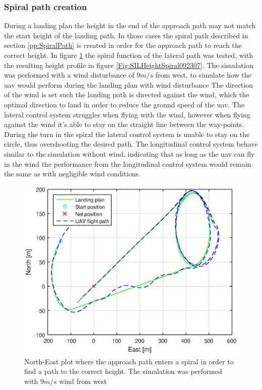 \subsubsection{Spiral path creation}
During a landing plan the height in the end of the approach path may not match the start height of the landing path. In those cases the spiral path described in section \ref{pp:SpiralPath} is created in order for the approach path to reach the correct height. In figure \ref{Fig:SILNorthEastSpiral092307} the spiral function of the lateral path was tested, with the resulting height profile in figure \ref{Fig:SILHeightSpiral092307}. The simulation was performed with a wind disturbance of $9 m/s$ from west, to simulate how the \gls{uav} would perform during the landing plan with wind disturbance The direction of the wind is set such the landing path is directed against the wind, which the optimal direction to land in order to reduce the ground speed of the \gls{uav}. The lateral control system struggles when flying with the wind, however when flying against the wind it's able to stay on the straight line between the way-points. During the turn in the spiral the lateral control system is unable to stay on the circle, thus overshooting the desired path. The longitudinal control system behave similar to the simulation without wind, indicating that as long as the \gls{uav} can fly in the wind the performance from the longitudinal control system would remain the same as with negligible wind conditions.
\begin{figure}[H]
\centering
\includegraphics[scale=0.7]{figs/SysPlot/SILNorthEast6juni092307.eps}
\caption{North-East plot where the approach path enters a spiral in order to find a path to the correct height. The simulation was performed with $9 m/s$ wind from west}
\label{Fig:SILNorthEastSpiral092307}
\end{figure}
